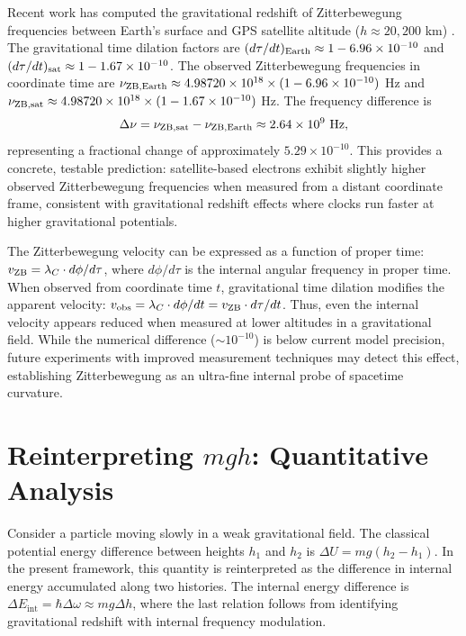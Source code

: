 \documentclass[%
 reprint,
 amsmath,amssymb,
 aps,
 prb,
]{revtex4-2}
\numberwithin{equation}{section}
\begin{document}
Recent work has computed the gravitational redshift of Zitterbewegung frequencies between Earth's surface and GPS satellite altitude ($h \approx 20{,}200$ km) \cite{Hanamura2025GravRedshift}. The gravitational time dilation factors are $(d\tau/dt)_{\rm Earth} \approx 1 - 6.96 \times 10^{-10}$ and $(d\tau/dt)_{\rm sat} \approx 1 - 1.67 \times 10^{-10}$. The observed Zitterbewegung frequencies in coordinate time are $\nu_{\rm ZB,Earth} \approx 4.98720 \times 10^{18} \times (1 - 6.96 \times 10^{-10})$ Hz and $\nu_{\rm ZB,sat} \approx 4.98720 \times 10^{18} \times (1 - 1.67 \times 10^{-10})$ Hz. The frequency difference is
\begin{equation}
\Delta\nu = \nu_{\rm ZB,sat} - \nu_{\rm ZB,Earth} \approx 2.64 \times 10^9 \text{ Hz},
\label{eq:frequency_difference}
\end{equation}
representing a fractional change of approximately $5.29 \times 10^{-10}$. This provides a concrete, testable prediction: satellite-based electrons exhibit slightly higher observed Zitterbewegung frequencies when measured from a distant coordinate frame, consistent with gravitational redshift effects where clocks run faster at higher gravitational potentials.

The Zitterbewegung velocity can be expressed as a function of proper time: $v_{\rm ZB} = \lambda_C \cdot d\phi/d\tau$, where $d\phi/d\tau$ is the internal angular frequency in proper time. When observed from coordinate time $t$, gravitational time dilation modifies the apparent velocity: $v_{\rm obs} = \lambda_C \cdot d\phi/dt = v_{\rm ZB} \cdot d\tau/dt$. Thus, even the internal velocity appears reduced when measured at lower altitudes in a gravitational field. While the numerical difference ($\sim 10^{-10}$) is below current model precision, future experiments with improved measurement techniques may detect this effect, establishing Zitterbewegung as an ultra-fine internal probe of spacetime curvature.

\section{Reinterpreting $mgh$: Quantitative Analysis}
\label{sec:mgh_reinterpret}

Consider a particle moving slowly in a weak gravitational field. The classical potential energy difference between heights $h_1$ and $h_2$ is $\Delta U = mg(h_2 - h_1)$. In the present framework, this quantity is reinterpreted as the difference in internal energy accumulated along two histories. The internal energy difference is $\Delta E_{\text{int}} = \hbar \Delta \omega \approx m g \Delta h$, where the last relation follows from identifying gravitational redshift with internal frequency modulation.
\end{document}
